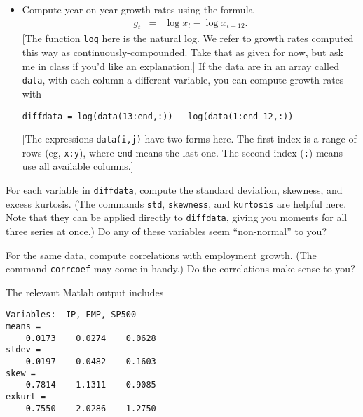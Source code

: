 \documentclass[11pt]{exam}
\begin{document}
\begin{questions}
\begin{itemize}
The same file is attached to the pdf version of this document:
download the pdf, open, click on pushpin:

The file contains monthly data, 1960 to the present,
for
Industrial Production (series INDPRO),
Employment (All Employees: Total Nonfarm, series PAYEMS),
and the S\&P 500 Index (SP500).
The first two series serve as monthly measures of economic activity.
Variation in their growth rates reflects the business cycle.
The last one is an important asset price,
and its growth rate is an approximate aggregate equity return.

\item Compute year-on-year growth rates using the formula
\begin{eqnarray*}
    g_{t} &=& \log x_t - \log x_{t-12} .
\end{eqnarray*}
[The function {\tt log} here is the natural log.
We refer to growth rates computed this way as continuously-compounded.
Take that as given for now,
but ask me in class if you'd like an explanation.]
If the data are in an array called {\tt data}, with each column a different variable,
you can compute growth rates with
\begin{verbatim}
diffdata = log(data(13:end,:)) - log(data(1:end-12,:))
\end{verbatim}
[The expressions {\tt data(i,j)} have two forms here.
The first index is a range of rows (eg, {\tt x:y}), where
{\tt end} means the last one.
The second index ({\tt :}) means use all available columns.]
\end{itemize}
%
%
\begin{parts}
\item For each variable in {\tt diffdata},
compute the standard deviation,
skewness, and excess kurtosis.
(The commands {\tt std}, {\tt skewness}, and {\tt kurtosis}
are helpful here.
Note that they can be applied directly to {\tt diffdata},
giving you moments for all three series at once.)
Do any of these variables seem ``non-normal'' to you?

\item For the same data, compute correlations with employment growth.
(The command {\tt corrcoef} may come in handy.)
Do the correlations make sense to you?
\end{parts}

\begin{solution}
The relevant Matlab output includes
%
\begin{verbatim}
Variables:  IP, EMP, SP500
means =
    0.0173    0.0274    0.0628
stdev =
    0.0197    0.0482    0.1603
skew =
   -0.7814   -1.1311   -0.9085
exkurt =
    0.7550    2.0286    1.2750
 

\end{verbatim}
\end{solution}
\end{questions}
\end{document}
